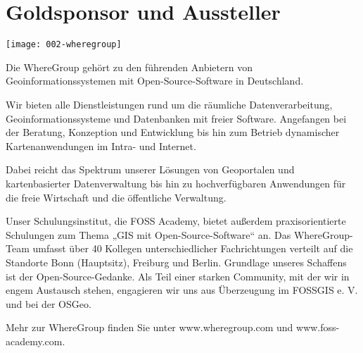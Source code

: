 \section*{Goldsponsor und Aussteller}
\begin{center}
  \texttt{[image: 002-wheregroup]}
\end{center}
Die WhereGroup gehört zu den führenden Anbietern von Geoinformationssystemen
mit Open-Source-Software in Deutschland.

Wir bieten alle Dienstleistungen rund um die räumliche Datenverarbeitung,
Geoinformationssysteme und Datenbanken mit freier Software. Angefangen bei der
Beratung, Konzeption und Entwicklung bis hin zum Betrieb dynamischer
Kartenanwendungen im Intra- und Internet.

Dabei reicht das Spektrum unserer Lösungen von Geoportalen und kartenbasierter
Datenverwaltung bis hin zu hochverfügbaren Anwendungen für die freie Wirtschaft
und die öffentliche Verwaltung.

Unser Schulungsinstitut, die FOSS Academy, bietet außerdem praxisorientierte
Schulungen zum Thema „GIS mit Open-Source-Software“ an.  Das WhereGroup-Team
umfasst über 40 Kollegen unterschiedlicher Fachrichtungen verteilt auf die
Standorte Bonn (Hauptsitz), Freiburg und Berlin.  Grundlage unseres Schaffens
ist der Open-Source-Gedanke. Als Teil einer starken Community, mit der wir in
engem Austausch stehen, engagieren wir uns aus Überzeugung im FOSSGIS e. V. und
bei der OSGeo.

Mehr zur WhereGroup finden Sie unter www.wheregroup.com und www.foss-academy.com.
